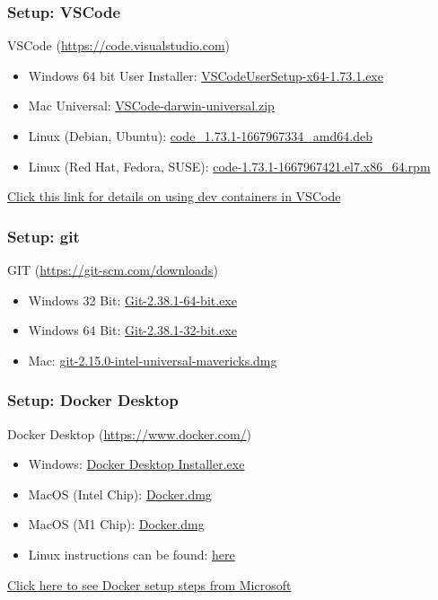 \documentclass[aspectratio=169]{beamer}
\begin{document}
\begin{frame}
	\frametitle{Setup: VSCode}
	VSCode (\href{https://code.visualstudio.com}{https://code.visualstudio.com})
	\begin{itemize}
		\item Windows 64 bit User Installer: \href{https://prereqs.codemash.org/Files/VVSCodeUserSetup-x64-1.73.1.exe}{VSCodeUserSetup-x64-1.73.1.exe}
		\item Mac Universal: \href{https://prereqs.codemash.org/Files/VSCode-darwin-universal.zip}{VSCode-darwin-universal.zip}
		\item Linux (Debian, Ubuntu): \href{https://prereqs.codemash.org/Files/code_1.73.1-1667967334_amd64.deb}{code\_1.73.1-1667967334\_amd64.deb}
		\item  Linux (Red Hat, Fedora, SUSE): \href{https://prereqs.codemash.org/Files/code-1.73.1-1667967421.el7.x86_64.rpm}{code-1.73.1-1667967421.el7.x86\_64.rpm}
	\end{itemize}
	\vspace{2mm}
	\href{https://code.visualstudio.com/docs/devcontainers/containers}{Click this link for details on using dev containers in VSCode}
\end{frame}

\begin{frame}
	\frametitle{Setup: git}
	GIT (\href{https://git-scm.com/downloads}{https://git-scm.com/downloads})
	\begin{itemize}
		\item Windows 32 Bit: \href{https://prereqs.codemash.org/Files/Git-2.38.1-64-bit.exe}{Git-2.38.1-64-bit.exe}
		\item Windows 64 Bit: \href{https://prereqs.codemash.org/Files/Git-2.38.1-32-bit.exe}{Git-2.38.1-32-bit.exe}
		\item Mac: \href{https://prereqs.codemash.org/Files/git-2.15.0-intel-universal-mavericks.dmg}{git-2.15.0-intel-universal-mavericks.dmg}
	\end{itemize}
\end{frame}

\begin{frame}
	\frametitle{Setup: Docker Desktop}
	Docker Desktop (\href{https://www.docker.com/}{https://www.docker.com/})

	\begin{itemize}
		\item Windows: \href{https://prereqs.codemash.org/Files/Docker\%20Desktop\%20Installer.exe}{Docker Desktop Installer.exe}
		\item MacOS (Intel Chip): \href{https://prereqs.codemash.org/Files/Docker.dmg}{Docker.dmg}
		\item MacOS (M1 Chip): \href{https://prereqs.codemash.org/Files/Chip/Docker.dmg}{Docker.dmg}
		\item Linux instructions can be found: \href{https://docs.docker.com/desktop/install/linux-install/}{here}
	\end{itemize}
	\vspace{2mm}

	\href{https://code.visualstudio.com/docs/devcontainers/containers\#\_installation}{Click here to see Docker setup steps from Microsoft}

\end{frame}
\end{document}

